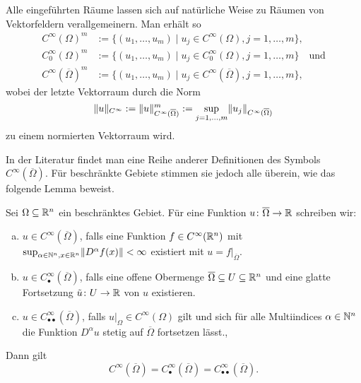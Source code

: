 Alle eingeführten Räume lassen sich auf natürliche Weise zu Räumen von Vektor\-feldern verallgemeinern.
Man erhält so
\begin{align*}
  C^\infty(\Omega)^m &:= \{(u_1,\dots,u_m) \mid u_j \in C^\infty(\Omega), j = 1,\dots,m\}, \\
  C_0^\infty(\Omega)^m &:= \{(u_1,\dots,u_m) \mid u_j \in C_0^\infty(\Omega), j = 1,\dots,m\} \quad\text{und} \\
  C^\infty(\overline\Omega)^m &:= \{(u_1,\dots,u_m) \mid u_j \in C^\infty(\overline\Omega), j = 1,\dots,m\},
\end{align*}
wobei der letzte Vektorraum durch die Norm
$$
\lVert u \rVert_{C^\infty} := \lVert u \rVert_{C^\infty(\overline\Omega)}^m := \sup_{j = 1,\dots, m} \lVert u_j \rVert_{C^\infty(\overline\Omega)}
$$
zu einem normierten Vektorraum wird.

In der Literatur findet man eine Reihe anderer Definitionen des Symbols $C^\infty(\overline\Omega)$.
Für beschränkte Gebiete stimmen sie jedoch alle überein, wie das folgende Lemma beweist.

\begin{lem}
  \label{lem:CInftyClosedOmega}
  Sei $\Omega \subseteq \mathbb{R}^n$ ein beschränktes Gebiet.
  Für eine Funktion $u \colon \overline\Omega \to \mathbb{R}$ schreiben wir:
  \begin{enumerate}[(a)]
    \item $u \in C^\infty(\overline\Omega)$,
      falls eine Funktion $f \in C^\infty(\mathbb{R}^n)$ mit $\sup_{\alpha \in \mathbb{N}^n, x \in \mathbb{R}^n} \lVert D^\alpha f(x) \rVert <  \infty$ existiert mit $u = f|_{\overline\Omega}$.\cite[S.23, I.3.1]{sohr2001navier}

    \item $u \in C^\infty_{\bullet}(\overline\Omega)$,
      falls eine offene Obermenge $\overline\Omega \subseteq U \subseteq \mathbb{R}^n$ und eine glatte Fortsetzung $\tilde u \colon U \to \mathbb{R}$ von $u$ existieren.

    \item $ u \in C^\infty_{\bullet\bullet}(\overline\Omega)$,
    falls $u|_\Omega \in C^\infty(\Omega)$ gilt und sich für alle Multiindices $\alpha \in \mathbb{N}^n$ die Funktion $D^\alpha u$ stetig auf $\overline\Omega$ fortsetzen lässt.\cite[S.10, 1.28]{adams2003sobolev},\cite[S.35, II.1.3]{galdi2011navier}
  \end{enumerate}

  Dann gilt
  $$
    C^\infty(\overline\Omega) =
    C^\infty_{\bullet}(\overline\Omega) =
    C^\infty_{\bullet\bullet}(\overline\Omega).
  $$
\end{lem}

